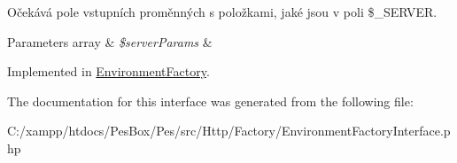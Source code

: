 Očekává pole vstupních proměnných s položkami, jaké jsou v poli \$\+\_\+\+S\+E\+R\+V\+ER.


\begin{DoxyParams}[1]{Parameters}
array & {\em \$server\+Params} & \\
\hline
\end{DoxyParams}


Implemented in \mbox{\hyperlink{class_pes_1_1_http_1_1_factory_1_1_environment_factory_aaf064f4cfd8fa6ba2e87755aa7f03b26}{Environment\+Factory}}.



The documentation for this interface was generated from the following file\+:\begin{DoxyCompactItemize}
\item 
C\+:/xampp/htdocs/\+Pes\+Box/\+Pes/src/\+Http/\+Factory/Environment\+Factory\+Interface.\+php\end{DoxyCompactItemize}
